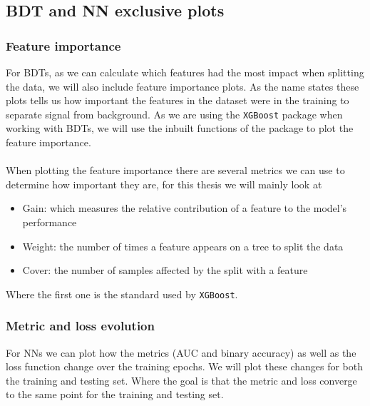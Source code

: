 \documentclass[12pt, a4paper]{book}
\begin{document}
\subsection{BDT and NN exclusive plots}
\subsubsection{Feature importance}
For BDTs, as we can calculate which features had the most impact when splitting the data, we will also include feature importance plots. As the name states these plots tells us how important the features in the dataset were in the training to separate signal from background. As we are using the \verb|XGBoost| 
package when working with BDTs, we will use the inbuilt functions of the package to plot the feature importance. \\
\\When plotting the feature importance there are several metrics we can use to determine how important they are, for this thesis we will mainly look at 
\begin{itemize}
    \item Gain: which measures the relative contribution of a feature to the model's performance
    \item Weight: the number of times a feature appears on a tree to split the data
    \item Cover: the number of samples affected by the split with a feature
\end{itemize}
Where the first one is the standard used by \verb|XGBoost|.

\subsubsection{Metric and loss evolution}
For NNs we can plot how the metrics (AUC and binary accuracy) as well as the loss function change over the training epochs. We will plot these changes for both the training and testing set. Where the goal is that the metric and loss converge to the same point for the training and testing set.
\end{document}
